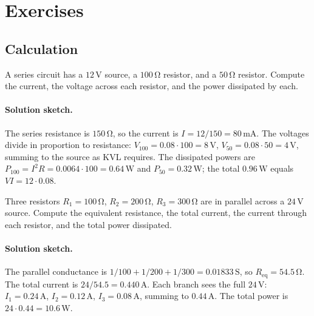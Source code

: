 \section{Exercises}

\subsection*{Calculation}

\begin{exercise}
A series circuit has a $12\,\si{\volt}$ source, a $100\,\si{\ohm}$
resistor, and a $50\,\si{\ohm}$ resistor. Compute the current, the
voltage across each resistor, and the power dissipated by each.
\paragraph{Solution sketch.}
The series resistance is $150\,\si{\ohm}$, so the current is
$I = 12/150 = 80\,\si{\milli\ampere}$. The voltages divide in
proportion to resistance: $V_{100} = 0.08\cdot 100 = 8\,\si{\volt}$,
$V_{50} = 0.08\cdot 50 = 4\,\si{\volt}$, summing to the source as KVL
requires. The dissipated powers are $P_{100} = I^{2}R = 0.0064\cdot
100 = 0.64\,\si{\watt}$ and $P_{50} = 0.32\,\si{\watt}$; the total
$0.96\,\si{\watt}$ equals $VI = 12\cdot 0.08$.
\end{exercise}

\begin{exercise}
Three resistors $R_{1} = 100\,\si{\ohm}$, $R_{2} = 200\,\si{\ohm}$,
$R_{3} = 300\,\si{\ohm}$ are in parallel across a $24\,\si{\volt}$
source. Compute the equivalent resistance, the total current, the
current through each resistor, and the total power dissipated.
\paragraph{Solution sketch.}
The parallel conductance is $1/100 + 1/200 + 1/300 = 0.01833\,\si{
\siemens}$, so $R_{\text{eq}} = 54.5\,\si{\ohm}$. The total current is
$24/54.5 = 0.440\,\si{\ampere}$. Each branch sees the full
$24\,\si{\volt}$: $I_{1} = 0.24\,\si{\ampere}$, $I_{2} = 0.12\,\si{
\ampere}$, $I_{3} = 0.08\,\si{\ampere}$, summing to $0.44\,\si{\ampere}$.
The total power is $24\cdot 0.44 = 10.6\,\si{\watt}$.
\end{exercise}


